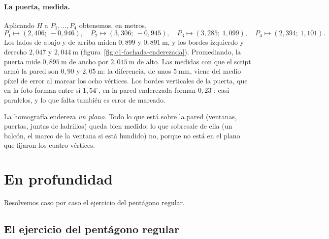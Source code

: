\paragraph{La puerta, medida.} Aplicando \(H\) a \(P_1,\dots,P_4\) obtenemos, en metros,
\[
  P_1\mapsto(2{,}406;\ -0{,}946),\quad P_2\mapsto(3{,}306;\ -0{,}945),\quad
  P_3\mapsto(3{,}285;\ 1{,}099),\quad P_4\mapsto(2{,}394;\ 1{,}101).
\]
Los lados de abajo y de arriba miden \(0{,}899\) y \(0{,}891\ \mathrm{m}\), y los bordes
izquierdo y derecho \(2{,}047\) y \(2{,}044\ \mathrm{m}\)
(figura~\ref{fig:c1-fachada-enderezada}). Promediando, la puerta mide \(0{,}895\ \mathrm{m}\) de
ancho por \(2{,}045\ \mathrm{m}\) de alto. Las medidas con que el script armó la pared son
\(0{,}90\) y \(2{,}05\ \mathrm{m}\): la diferencia, de unos \(5\ \mathrm{mm}\), viene del medio
píxel de error al marcar los ocho vértices. Los bordes verticales de la puerta, que en la foto
forman entre sí \(1{,}54^\circ\), en la pared enderezada forman \(0{,}23^\circ\): casi
paralelos, y lo que falta también es error de marcado.

\begin{atencion}
La homografía endereza \emph{un plano}. Todo lo que está sobre la pared (ventanas, puertas,
juntas de ladrillos) queda bien medido; lo que sobresale de ella (un balcón, el marco de la
ventana si está hundido) no, porque no está en el plano que fijaron los cuatro vértices.
\end{atencion}


\section{En profundidad}

Resolvemos caso por caso el ejercicio del pentágono regular.

\subsection{El ejercicio del pentágono regular}

